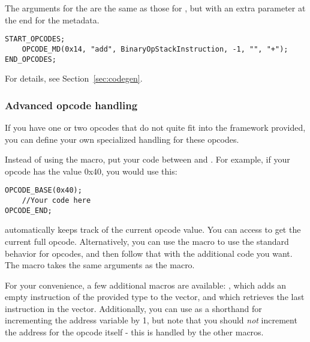 The arguments for the  are the same as those for , but with an extra parameter at the end for the metadata.

\begin{C++}
\begin{lstlisting}
START_OPCODES;
	OPCODE_MD(0x14, "add", BinaryOpStackInstruction, -1, "", "+");
END_OPCODES;
\end{lstlisting}
\end{C++}

For details, see Section~\vref{sec:codegen}.

\subsubsection{Advanced opcode handling}
If you have one or two opcodes that do not quite fit into the framework provided, you can define your own specialized handling for these opcodes.

Instead of using the  macro, put your code between  and . For example, if your opcode has the value 0x40, you would use this:

\begin{C++}
\begin{lstlisting}
OPCODE_BASE(0x40);
	//Your code here
OPCODE_END;
\end{lstlisting}
\end{C++}

 automatically keeps track of the current opcode value. You can access  to get the current full opcode. Alternatively, you can use the  macro to use the standard behavior for opcodes, and then follow that with the additional code you want. The  macro takes the same arguments as the  macro.

For your convenience, a few additional macros are available: , which adds an empty instruction of the provided type to the vector, and  which retrieves the last instruction in the vector. Additionally, you can use  as a shorthand for incrementing the address variable by 1, but note that you should \emph{not} increment the address for the opcode itself - this is handled by the other macros.
